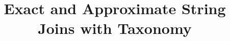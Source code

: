 \documentclass{sig-alternate}
\newcommand{\topkm}{\mbox{top-$k$,$m$}}
\begin{document}


\title{Exact and Approximate String Joins with Taxonomy}


\author{
}




\maketitle
\end{document}
